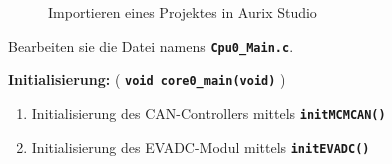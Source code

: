 \documentclass[
    fontsize=12pt,                      %
    paper=a4,                           %
    twoside=off,                       %
    DIV=15,                             %
    BCOR=12mm,                          %
    headings=normal,                    %
    headsepline=false,                   %
    footsepline=false,                  %
    headinclude=true,                   %
    footinclude=false,                  %
    toc=listof,                         %
    toc=bib,                            %
    chapterprefix=false,                %
    appendixprefix=false,               %
    numbers=noendperiod,                %
    captions=tableabove,                %
    footnotes=multiple,                 %
    bibliography=oldstyle,              %
    draft=false,                        %
]{scrreprt}
\newcommand{\Farbcode}[1]{\texttt{\textbf{\textcolor{myred}{#1}}}}
\begin{document}
\begin{figure}[H]
  \centering
  \quad
  \caption{Importieren eines Projektes in Aurix Studio}%
\end{figure}

Bearbeiten sie die Datei namens \Farbcode{Cpu0\_Main.c}.

\vskip 0.2cm

\noindent
\textbf{Initialisierung:} ( \Farbcode{void core0\_main(void)} )

\begin{enumerate}

\item Initialisierung des CAN-Controllers mittels \Farbcode{initMCMCAN()}
\item Initialisierung des EVADC-Modul mittels \Farbcode{initEVADC()}
\end{enumerate}
\end{document}
